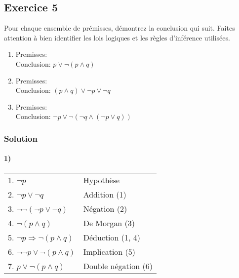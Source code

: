 \subsection*{Exercice 5}
Pour chaque ensemble de prémisses, démontrez la conclusion qui suit. Faites attention à bien identifier les
lois logiques et les règles d'inférence utilisées.
\begin{enumerate}
\item Premisses: \\
      Conclusion: $p \vee \neg (p \wedge q)$
\item Premisses: \\
      Conclusion: $(p \wedge q) \vee \neg p \vee \neg q$
\item Premisses: \\
      Conclusion: $\neg p \vee \neg (\neg q \wedge (\neg p \vee q))$
\end{enumerate}

    \subsubsection*{Solution}
    
    \paragraph{1)}
    \begin{center}
    \begin{tabular}{|l|l|}
    \hline
    \hspace{0.5cm} 1. $\neg p$ & Hypothèse \\
    \hspace{0.5cm} 2. $\neg p \lor \neg q$ & Addition (1) \\
    \hspace{0.5cm} 3. $\neg \neg(\neg p \lor \neg q)$ & Négation (2) \\
    \hspace{0.5cm} 4. $\neg(p \land q)$ & De Morgan (3)\\ 
    5. $\neg p \Rightarrow \neg(p \land q)$ & Déduction (1, 4) \\
    6. $\neg \neg p \lor \neg(p \land q)$ & Implication (5)\\
    7. $p \lor \neg(p \land q)$ & Double négation (6)\\
    \hline
    \end{tabular}
    \end{center}

